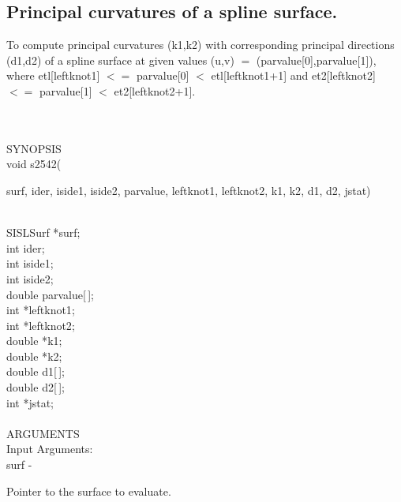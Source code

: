 \subsection{Principal curvatures of a spline surface.}
\begin{minipg1}
 To compute principal curvatures (k1,k2) with corresponding 
                   principal directions (d1,d2) of a spline surface at
                   given values (u,v) $=$ (parvalue[0],parvalue[1]), where
                   etl[leftknot1] $<=$ parvalue[0] $<$ etl[leftknot1+1] and
                   et2[leftknot2] $<=$ parvalue[1] $<$ et2[leftknot2+1].
\end{minipg1} \\ \\
SYNOPSIS\\
        \>  void s2542(\begin{minipg3}
            {\fov surf},  {\fov ider},  {\fov iside1},  {\fov iside2},   {\fov parvalue},  {\fov leftknot1},  {\fov leftknot2}, 
	     {\fov k1},  {\fov k2},  {\fov d1},  {\fov d2},  {\fov jstat})
                \end{minipg3}\\
                \>\>    SISLSurf \> *{\fov surf};\\
                \>\>    int    \>  {\fov ider};\\
                \>\>    int    \>  {\fov iside1};\\
                \>\>    int    \>  {\fov iside2};\\
                \>\>    double \> {\fov parvalue}[\,];\\
                \>\>    int \> *{\fov leftknot1};\\
                \>\>    int \> *{\fov leftknot2};\\
                \>\>    double \> *{\fov k1};\\
                \>\>    double \> *{\fov k2};\\
                \>\>    double \> {\fov d1}[\,];\\
                \>\>    double \> {\fov d2}[\,];\\
                \>\>    int \> *{\fov jstat};\\
\\
ARGUMENTS\\
	\>Input Arguments:\\
        \>\>    {\fov surf}\> - \>  \begin{minipg2}
                     Pointer to the surface to evaluate.
                               \end{minipg2}\\[0.8ex]
